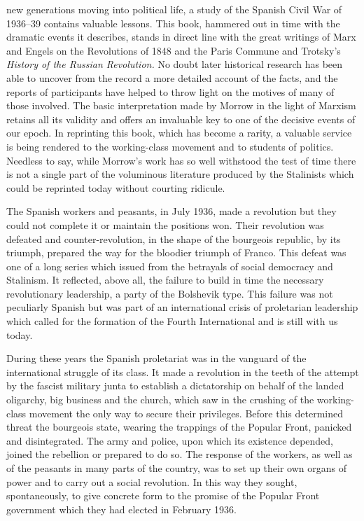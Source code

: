  new generations moving into political life, a study of the Spanish Civil War of 1936–39 contains valuable lessons. This book, hammered out in time with the dramatic events it describes, stands in direct line with the great writings of Marx and Engels on the Revolutions of 1848 and the Paris Commune and Trotsky’s \emph{History of the Russian Revolution.} No doubt later historical research has been able to uncover from the record a more detailed account of the facts, and the reports of participants have helped to throw light on the motives of many of those involved. The basic interpretation made by Morrow in the light of Marxism retains all its validity and offers an invaluable key to one of the decisive events of our epoch. In reprinting this book, which has become a rarity, a valuable service is being rendered to the working-class movement and to students of politics. Needless to say, while Morrow’s work has so well withstood the test of time there is not a single part of the voluminous literature produced by the Stalinists which could be reprinted today without courting ridicule.

The Spanish workers and peasants, in July 1936, made a revolution but they could not complete it or maintain the positions won. Their revolution was defeated and counter-revolution, in the shape of the bourgeois republic, by its triumph, prepared the way for the bloodier triumph of Franco. This defeat was one of a long series which issued from the betrayals of social democracy and Stalinism. It reflected, above all, the failure to build in time the necessary revolutionary leadership, a party of the Bolshevik type. This failure was not peculiarly Spanish but was part of an international crisis of proletarian leadership which called for the formation of the Fourth International and is still with us today.
\nowidow

During these years the Spanish proletariat was in the vanguard of the international struggle of its class. It made a revolution in the teeth of the attempt by the fascist military junta to establish a dictatorship on behalf of the landed oligarchy, big business and the church, which saw in the crushing of the working-class movement the only way to secure their privileges. Before this determined threat the bourgeois state, wearing the trappings of the Popular Front, panicked and disintegrated. The army and police, upon which its existence depended, joined the rebellion or prepared to do so. The response of the workers, as well as of the peasants in many parts of the country, was to set up their own organs of power and to carry out a social revolution. In this way they sought, spontaneously, to give concrete form to the promise of the Popular Front government which they had elected in February 1936.

